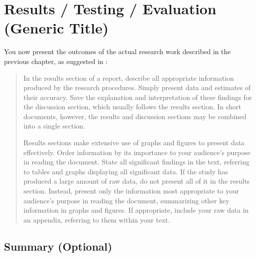 \chapter{Results / Testing / Evaluation (Generic Title)}
\label{chap:evaluation} 

You now present the outcomes of the actual research work described in the previous chapter, as suggested in \cite{perelman97mht}:


\begin{quotation}
In the results section of a report, describe all appropriate information produced by the research procedures. Simply present data and estimates of their accuracy. Save the explanation and interpretation of these findings for the discussion section, which usually follows the results section. In short documents, however, the results and discussion sections may be combined into a single section.

Results sections make extensive use of graphs and figures to present data effectively. Order information by its importance to your audience's purpose in reading the document. State all significant findings in the text, referring to tables and graphs displaying all significant data. If the study has produced a large amount of raw data, do not present all of it in the results section. Instead, present only the information most appropriate to your audience's purpose in reading the document, summarizing other key information in graphs and figures. If appropriate, include your raw data in an appendix, referring to them within your text.
\end{quotation}


\lipsum[52-60]

\section{Summary (Optional)}



